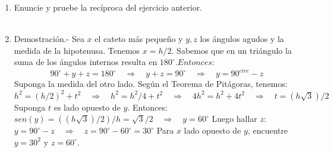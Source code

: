 \documentclass[10pt]{article}
\begin{document}
\begin{enumerate}
\item Enuncie y pruebe la recíproca del ejercicio anterior.\\\\

\item 
    Demostración.-\; Sea $x$ el cateto más pequeño y $y, z$ los ángulos agudos y la medida de la hipotenusa. Tenemos $x = h / 2.$ Sabemos que en un triángulo la suma de los ángulos internos resulta en $180^{\circ}. Entonces:
$$$90^{\circ} + y + z = 180^{\circ} \quad \Rightarrow \quad y + z = 90^{\circ} \quad \Rightarrow \quad y = 90^{circ} -z$$
Suponga la medida del otro lado. Según el Teorema de Pitágoras, tenemos: $h^2 = (h / 2)^2 + t^2 \quad \Rightarrow \quad h^2 = h^2 / 4 + t^2 \quad \Rightarrow \quad 4h^2 = h^2 + 4t^2 \quad \Rightarrow \quad t = (h\sqrt{3}) / 2$
Suponga $t$ es lado opuesto de $y$. Entonces:
$sen (y) = ( (h\sqrt{3}) / 2) / h = \sqrt{3}/2 \quad \Rightarrow \quad y = 60^{\circ}$
Luego hallar $z$:
$y = 90^{\circ} -z \quad \Rightarrow \quad z = 90^{\circ} -60^{\circ} = 30^{\circ}$ 
Para $x$ lado opuesto de $y$, encuentre $y = 30^2$ y $z = 60^{\circ}.$\\\\

\end{enumerate}
\end{document}
